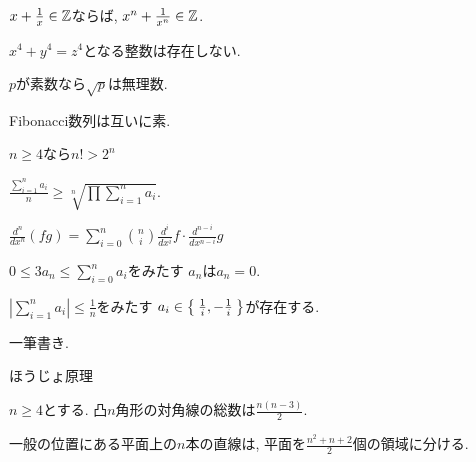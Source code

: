 \begin{prop}
  $x+\frac{1}{x}\in\mathbb{Z}$ならば, 
  $x^n+\frac{1}{x^n}\in\mathbb{Z}$.
\end{prop}


\begin{prop}
  $x^4+y^4=z^4$となる整数は存在しない.
\end{prop}

\begin{prop}
  $p$が素数なら$\sqrt{p}$は無理数.
\end{prop}

\begin{prop}
  Fibonacci数列は互いに素.
\end{prop}



\begin{prop}
  $n\geq 4$なら$n!>2^n$
\end{prop}



\begin{prop}
  $\frac{\sum_{i=1}^n a_i}{n} \geq \sqrt[n]{\prod\sum_{i=1}^n a_i}$.
\end{prop}


\begin{prop}
$\frac{d^n}{dx^n}(fg)=\sum_{i=0}^n\binom{n}{i}\frac{d^i}{dx^i}f \cdot \frac{d^{n-i}}{dx^{n-i}}g$
\end{prop}




\begin{prop}
  $0\leq 3a_n\leq\sum_{i=0}^n a_i$をみたす
  $a_n$は$a_n=0$.
\end{prop}

\begin{prop}
  $|\sum_{i=1}^{n}a_i|\leq \frac{1}{n}$をみたす
  $a_i\in\Set{\frac{1}{i},-\frac{1}{i}}$が存在する.
\end{prop}

\begin{prop}
一筆書き.
\end{prop}

\begin{prop}
ほうじょ原理
\end{prop}

\begin{prop}
  $n\geq 4$とする.
  凸$n$角形の対角線の総数は$\frac{n(n-3)}{2}$.
\end{prop}

\begin{prop}
  一般の位置にある平面上の$n$本の直線は,
  平面を$\frac{n^2+n+2}{2}$個の領域に分ける.
\end{prop}

